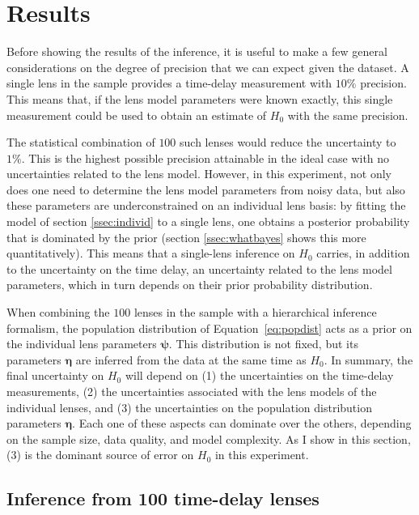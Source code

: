 \documentclass{aa}
\def\hyperpars{\boldsymbol{\eta}}
\def\indpar{\boldsymbol{\psi}}
\def\Eref#1{Equation~\ref{#1}\xspace}
\begin{document}

\section{Results}\label{sect:results}

Before showing the results of the inference, it is useful to make a few general considerations on the degree of precision that we can expect given the dataset.
A single lens in the sample provides a time-delay measurement with $10\%$ precision. This means that, if the lens model parameters were known exactly, this single measurement could be used to obtain an estimate of $H_0$ with the same precision.

The statistical combination of $100$ such lenses would reduce the uncertainty to $1\%$.
This is the highest possible precision attainable in the ideal case with no uncertainties related to the lens model. However, in this experiment, not only does one need to determine the lens model parameters from noisy data, but also these parameters are underconstrained on an individual lens basis: by fitting the model of section \ref{ssec:individ} to a single lens, one obtains a posterior probability that is dominated by the prior (section \ref{ssec:whatbayes} shows this more quantitatively).
This means that a single-lens inference on $H_0$ carries, in addition to the uncertainty on the time delay, an uncertainty related to the lens model parameters, which in turn depends on their prior probability distribution.

When combining the $100$ lenses in the sample with a hierarchical inference formalism, the population distribution of \Eref{eq:popdist} acts as a prior on the individual lens parameters $\indpar$. This distribution is not fixed, but its parameters $\hyperpars$ are inferred from the data at the same time as $H_0$.
In summary, the final uncertainty on $H_0$ will depend on (1) the uncertainties on the time-delay measurements, (2) the uncertainties associated with the lens models of the individual lenses, and (3) the uncertainties on the population distribution parameters $\hyperpars$. 
Each one of these aspects can dominate over the others, depending on the sample size, data quality, and model complexity. As I show in this section, (3) is the dominant source of error on $H_0$ in this experiment.

\subsection{Inference from 100 time-delay lenses}\label{ssec:100alone}
\end{document}
